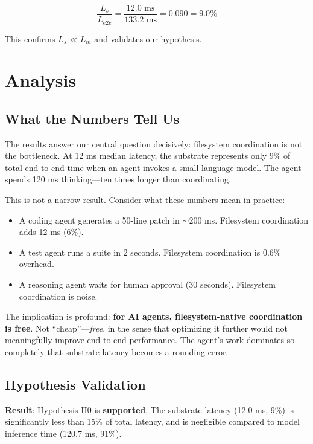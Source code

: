 \documentclass[11pt]{article}
\begin{document}
\begin{equation}
\frac{L_s}{L_{e2e}} = \frac{12.0\text{ ms}}{133.2\text{ ms}} = 0.090 = 9.0\%
\end{equation}

This confirms $L_s \ll L_m$ and validates our hypothesis.

\section{Analysis}

\subsection{What the Numbers Tell Us}

The results answer our central question decisively: filesystem coordination is not the bottleneck. At 12 ms median latency, the substrate represents only 9\% of total end-to-end time when an agent invokes a small language model. The agent spends 120 ms thinking---ten times longer than coordinating.

This is not a narrow result. Consider what these numbers mean in practice:
\begin{itemize}
\item A coding agent generates a 50-line patch in $\sim$200 ms. Filesystem coordination adds 12 ms (6\%).
\item A test agent runs a suite in 2 seconds. Filesystem coordination is 0.6\% overhead.
\item A reasoning agent waits for human approval (30 seconds). Filesystem coordination is noise.
\end{itemize}

The implication is profound: \textbf{for AI agents, filesystem-native coordination is free}. Not ``cheap''---\emph{free}, in the sense that optimizing it further would not meaningfully improve end-to-end performance. The agent's work dominates so completely that substrate latency becomes a rounding error.

\subsection{Hypothesis Validation}

\textbf{Result}: Hypothesis H0 is \textbf{supported}. The substrate latency (12.0 ms, 9\%) is significantly less than 15\% of total latency, and is negligible compared to model inference time (120.7 ms, 91\%).
\end{document}
